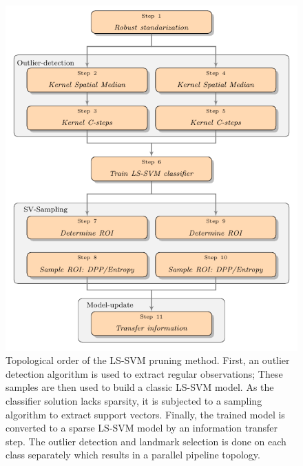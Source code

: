 \documentclass[preprint,12pt]{elsarticle}
\begin{document}
	\begin{figure}[!htb]
		\centering
		\centering\includegraphics[width=0.8\linewidth]{flow/gabstract.pdf}
		\caption{Topological order of the LS-SVM pruning method. First, an outlier detection algorithm is used to extract regular observations; These samples are then used to build a classic LS-SVM model. As the classifier solution lacks sparsity, it is subjected to a sampling algorithm to extract support vectors. Finally, the trained model is converted to a sparse LS-SVM model by an information transfer step.  The outlier detection and landmark selection is done on each class separately which results in a parallel pipeline topology.} 
		\label{fig:pipeline}
	\end{figure}
\end{document}
